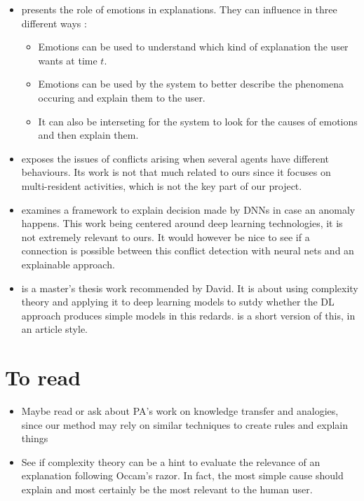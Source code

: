 \documentclass{article}
\begin{document}
\begin{itemize}
    \item\cite{kaptein2017emotion} presents the role of emotions in explanations. They can influence in three different ways :
    \begin{itemize}
        \item Emotions can be used to understand which kind of explanation the user wants at time $t$.
        \item Emotions can be used by the system to better describe the phenomena occuring and explain them to the user.
        \item It can also be interseting for the system to look for the causes of emotions and then explain them.
    \end{itemize}
    
    \item\cite{mohamed2017conflict} exposes the issues of conflicts arising when several agents have different behaviours. Its work is not that much related to ours since it focuses on multi-resident activities, which is not the key part of our project.

    \item\cite{amarasinghe2018toward} examines a framework to explain decision made by DNNs in case an anomaly happens. This work being centered around deep learning technologies, it is not extremely relevant to ours. It would however be nice to see if a connection is possible between this conflict detection with neural nets and an explainable approach.

    \item\cite{blier2017universal} is a master's thesis work recommended by David. It is about using complexity theory and applying it to deep learning models to sutdy whether the DL approach produces simple models in this redards. \cite{blierdescription} is a short version of this, in an article style.
    
    \end{itemize}

    
    \section{To read}
    \begin{itemize}
        \item Maybe read or ask about PA's work on knowledge transfer and analogies, since our method may rely on similar techniques to create rules and explain things

        \item See if complexity theory can be a hint to evaluate the relevance of an explanation following Occam's razor. In fact, the most simple cause should explain and most certainly be the most relevant to the human user.
    \end{itemize}
    
\newpage


\end{document}
